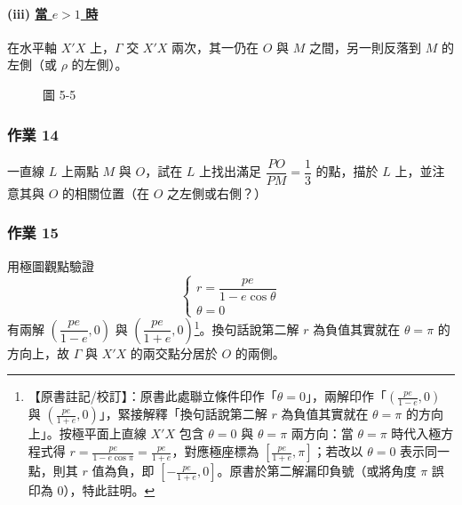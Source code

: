 \paragraph*{(iii) \underline{當 $e > 1$ 時}}
在水平軸 $X'X$ 上，$\Gamma$ 交 $X'X$ 兩次，其一仍在 $O$ 與 $M$ 之間，另一則反落到 $M$ 的左側（或 $\rho$ 的左側）。

\begin{figure}[H]
\centering
{}
\caption*{圖 5-5}
\label{fig:b5s-5-5}
\end{figure}

\subsubsection*{作業 14}
一直線 $L$ 上兩點 $M$ 與 $O$，試在 $L$ 上找出滿足 $\dfrac{PO}{PM} = \dfrac{1}{3}$ 的點，描於 $L$ 上，並注意其與 $O$ 的相關位置（在 $O$ 之左側或右側？）

\subsubsection*{作業 15}
用極圖觀點驗證
\[
  \begin{cases}
    r = \dfrac{pe}{1 - e\cos\theta} \\[0.6em]
    \theta = 0
  \end{cases}
\]
有兩解 $\left(\dfrac{pe}{1-e}, 0\right)$ 與 $\left(\dfrac{pe}{1+e}, 0\right)$\label{note:b5s-ch1-p48-hw15}\footnote{【原書註記/校訂】：原書此處聯立條件印作「$\theta = 0$」，兩解印作「$\left(\frac{pe}{1-e}, 0\right)$ 與 $\left(\frac{pe}{1+e}, 0\right)$」，緊接解釋「換句話說第二解 $r$ 為負值其實就在 $\theta = \pi$ 的方向上」。按極平面上直線 $X'X$ 包含 $\theta = 0$ 與 $\theta = \pi$ 兩方向：當 $\theta = \pi$ 時代入極方程式得 $r = \frac{pe}{1 - e\cos\pi} = \frac{pe}{1+e}$，對應極座標為 $\left[\frac{pe}{1+e}, \pi\right]$；若改以 $\theta = 0$ 表示同一點，則其 $r$ 值為負，即 $\left[-\frac{pe}{1+e}, 0\right]$。原書於第二解漏印負號（或將角度 $\pi$ 誤印為 $0$），特此註明。}。換句話說第二解 $r$ 為負值其實就在 $\theta = \pi$ 的方向上，故 $\Gamma$ 與 $X'X$ 的兩交點分居於 $O$ 的兩側。

